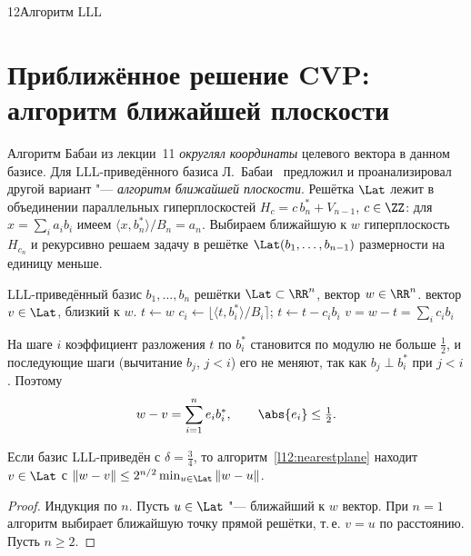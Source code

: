 \begin{lecture}{12}{Алгоритм LLL}

\section{Приближённое решение CVP: алгоритм ближайшей плоскости}

Алгоритм Бабаи из лекции~11 \emph{округлял координаты} целевого вектора в данном базисе.
Для LLL-приведённого базиса Л.~Бабаи~\cite{babai} предложил и проанализировал другой
вариант "--- \emph{алгоритм ближайшей плоскости}. Решётка $\Lat$ лежит в объединении
параллельных гиперплоскостей $H_c = c\, b_n^* + V_{n-1}$, $c \in \ZZ$: для
$x = \sum_i a_i b_i$ имеем $\langle x, b_n^* \rangle / B_n = a_n$. Выбираем ближайшую к $w$
гиперплоскость $H_{c_n}$ и рекурсивно решаем задачу в решётке
$\Lat(b_1, \dots, b_{n-1})$ размерности на единицу меньше.

\begin{algorithm}\label{l12:nearestplane}
\begin{algorithmic}[1]
\Require LLL-приведённый базис $b_1, \dots, b_n$ решётки $\Lat \subset \RR^n$, вектор $w \in \RR^n$.
\Ensure вектор $v \in \Lat$, близкий к $w$.
\State $t \gets w$
  \State $c_i \gets \lfloor \langle t, b_i^* \rangle / B_i \rceil$; \quad $t \gets t - c_i b_i$
\EndFor
\State \Return $v = w - t = \sum_i c_i b_i$
\end{algorithmic}
\end{algorithm}

На шаге $i$ коэффициент разложения $t$ по $b_i^*$ становится по модулю не больше $\frac12$,
и последующие шаги (вычитание $b_j$, $j < i$) его не меняют, так как $b_j \perp b_i^*$
при $j < i$. Поэтому
\begin{equation}\label{l12:residual}
  w - v = \sum_{i=1}^n e_i b_i^*, \qquad \abs{e_i} \le \tfrac12 .
\end{equation}

\begin{theorem}[Бабаи, 1986]\label{l12:babai}
Если базис LLL-приведён с $\delta = \frac34$, то алгоритм~\ref{l12:nearestplane} находит
$v \in \Lat$ с $\|w - v\| \le 2^{n/2} \min_{u \in \Lat} \|w - u\|$.
\end{theorem}

\begin{proof}
Индукция по $n$. Пусть $u \in \Lat$ "--- ближайший к $w$ вектор. При $n = 1$ алгоритм выбирает
ближайшую точку прямой решётки, т.\,е. $v = u$ по расстоянию. Пусть $n \ge 2$.


\end{proof}
\end{lecture}
